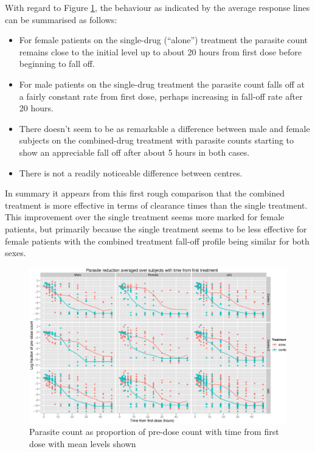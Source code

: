 \pagebreak
With regard to Figure \ref{allaov}, the behaviour as indicated by the average response lines can be summarised as follows:
\begin{itemize}
 \item For female patients on the single-drug (``alone'') treatment the parasite count remains close to the initial level up to about 20 hours from first dose before beginning to fall off.
 \item For male patients on the single-drug treatment the parasite count falls off at a fairly constant rate from first dose, perhaps increasing in fall-off rate after 20 hours.
\item There doesn't seem to be as remarkable a difference between male and female subjects on the combined-drug treatment with parasite counts starting to show an appreciable fall off after about 5 hours in both cases.
\item There is not a readily noticeable difference between centres.
\end{itemize}
In summary it appears from this first rough comparison that the combined treatment is more effective in terms of clearance times than the single treatment. This improvement over the single treatment seems more marked for female patients, but primarily because the single treatment seems to be less effective for female patients with the combined treatment fall-off profile being similar for both sexes.
\begin{figure}
\includegraphics[width=9.2in]{allaov.eps}
\caption{Parasite count as proportion of pre-dose count with time from first dose with mean levels shown}
\label{allaov}
\end{figure}

